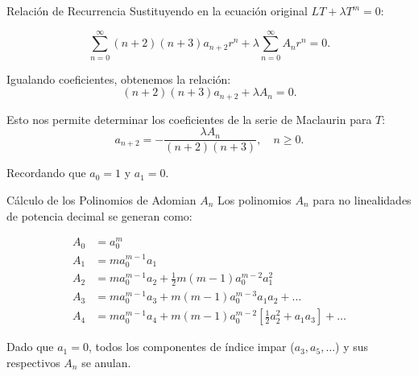 \begin{frame}{Relación de Recurrencia}
    Sustituyendo en la ecuación original $LT + \lambda T^m = 0$:

    \begin{equation}
        \sum_{n=0}^{\infty} (n+2)(n+3) a_{n+2} r^{n} + \lambda \sum_{n=0}^{\infty} A_{n} r^{n} = 0.
    \end{equation}

    Igualando coeficientes, obtenemos la relación:
    \begin{equation}
        (n+2)(n+3) a_{n+2} + \lambda A_{n} = 0.
    \end{equation}

    Esto nos permite determinar los coeficientes de la serie de Maclaurin para $T$:
    \begin{equation}
        a_{n+2} = -\frac{\lambda A_{n}}{(n+2)(n+3)}, \quad n \ge 0.
    \end{equation}

    Recordando que $a_{0}=1$ y $a_{1}=0$.
\end{frame}

\begin{frame}{Cálculo de los Polinomios de Adomian $A_n$}
    Los polinomios $A_n$ para no linealidades de potencia decimal se generan como:

    \begin{align*}
        A_{0} & = a_{0}^{m}                                                                                           \\
        A_{1} & = m a_{0}^{m-1} a_{1}                                                                                 \\
        A_{2} & = m a_{0}^{m-1} a_{2} + \frac{1}{2}m(m-1) a_{0}^{m-2} a_{1}^{2}                                       \\
        A_{3} & = m a_{0}^{m-1} a_{3} + m(m-1) a_{0}^{m-3} a_{1} a_{2} + \dots                                        \\
        A_{4} & = m a_{0}^{m-1} a_{4} + m(m-1) a_{0}^{m-2} \left[ \frac{1}{2} a_{2}^{2} + a_{1} a_{3} \right] + \dots
    \end{align*}

    Dado que $a_1 = 0$, todos los componentes de índice impar ($a_3, a_5, \dots$) y sus respectivos $A_n$ se anulan.
\end{frame}

